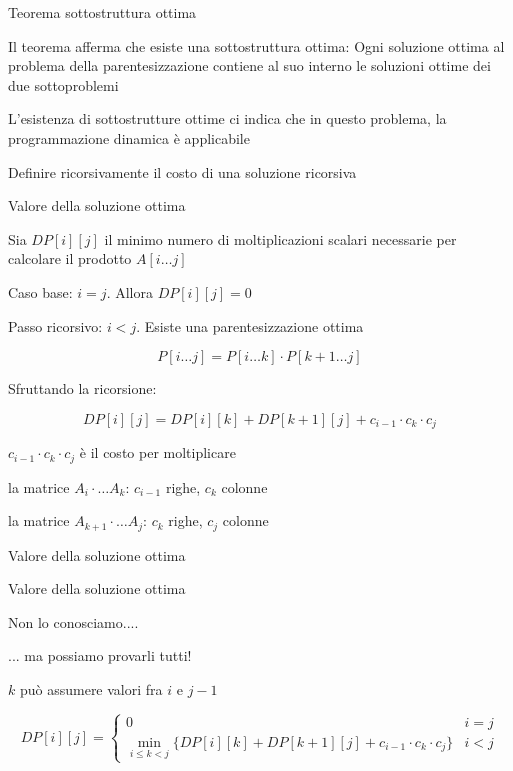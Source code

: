 \begin{frame}{Teorema sottostruttura ottima}

Il teorema afferma che esiste una \alert{sottostruttura ottima}: Ogni soluzione ottima al problema della parentesizzazione contiene al suo interno le soluzioni ottime dei due sottoproblemi

\bigskip
{}
L'esistenza di sottostrutture ottime ci indica che in questo problema, la programmazione dinamica è applicabile

\bigskip
{}
Definire ricorsivamente il costo di una soluzione ricorsiva
\end{frame}

\begin{frame}{Valore della soluzione ottima}

Sia \alert{$DP[i][j]$} il minimo numero di moltiplicazioni scalari necessarie per calcolare il prodotto $A[i \ldots j]$

\BIL
\item \alert{Caso base: $i=j$}. Allora $DP[i][j]=0$
\item \alert{Passo ricorsivo: $i < j$}. Esiste una parentesizzazione ottima 

\[
P[i \ldots j] = P[i \ldots k]  \cdot P[k+1 \ldots j]
\]

Sfruttando la ricorsione:

\[
DP[i][j] = DP[i][k] + DP[k+1][j] + c_{i-1} \cdot c_k \cdot c_j
\]

\item \alert{$c_{i-1} \cdot c_k \cdot c_j$} è il costo per moltiplicare
\BI
\item la matrice $A_i \cdot \ldots A_k$: $c_{i-1}$ righe, $c_k$ colonne
\item la matrice $A_{k+1} \cdot \ldots A_j$: $c_k$ righe, $c_j$ colonne
\EI
\EIL

\end{frame}

\begin{frame}{Valore della soluzione ottima}

\vspace{-12pt}

\end{frame}

\begin{frame}{Valore della soluzione ottima}

\BIL
\item Non lo conosciamo....
\item ... ma possiamo provarli tutti!
\item $k$ può assumere valori fra $i$ e $j-1$
\EIL

\bigskip
{}
\[
  DP[i][j] = \begin{cases}
    0 & i=j \\
    \min_{i \leq k < j} \{ DP[i][k] + DP[k+1][j] + c_{i-1} \cdot c_k \cdot c_j \}  & i<j 
  \end{cases}
\]

\end{frame}


